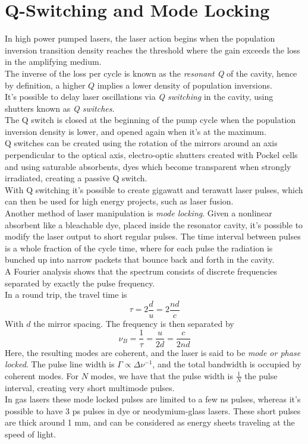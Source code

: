 \documentclass[../electromagnetism.tex]{subfiles}
\begin{document}
\section{Q-Switching and Mode Locking}
In high power pumped lasers, the laser action begins when the population inversion transition density reaches the threshold where the gain exceeds the loss in the amplifying medium.\\
The inverse of the loss per cycle is known as the \textit{resonant Q} of the cavity, hence by definition, a higher $Q$ implies a lower density of population inversions.\\
It's possible to delay laser oscillations via \textit{Q switching} in the cavity, using shutters known as \textit{Q switches}.\\
The Q switch is closed at the beginning of the pump cycle when the population inversion density is lower, and opened again when it's at the maximum.\\
Q switches can be created using the rotation of the mirrors around an axis perpendicular to the optical axis, electro-optic shutters created with Pockel cells and using saturable absorbents, dyes which become transparent when strongly irradiated, creating a passive Q switch.\\
With Q switching it's possible to create gigawatt and terawatt laser pulses, which can then be used for high energy projects, such as laser fusion.\\
Another method of laser manipulation is \textit{mode locking}. Given a nonlinear absorbent like a bleachable dye, placed inside the resonator cavity, it's possible to modify the laser output to short regular pulses. The time interval between pulses is a whole fraction of the cycle time, where for each pulse the radiation is bunched up into narrow packets that bounce back and forth in the cavity.\\
A Fourier analysis shows that the spectrum consists of discrete frequencies separated by exactly the pulse frequency.\\
In a round trip, the travel time is
\begin{equation*}
	\tau=2\frac{d}{u}=2\frac{nd}{c}
\end{equation*}
With $d$ the mirror spacing. The frequency is then separated by
\begin{equation*}
	\nu_B=\frac{1}{\tau}=\frac{u}{2d}=\frac{c}{2nd}
\end{equation*}
Here, the resulting modes are coherent, and the laser is said to be \textit{mode or phase locked}. The pulse line width is $\Gamma\propto\Delta\nu^{-1}$, and the total bandwidth is occupied by coherent modes. For $N$ modes, we have that the pulse width is $\frac{1}{N}$ the pulse interval, creating very short multimode pulses.\\
In gas lasers these mode locked pulses are limited to a few ns pulses, whereas it's possible to have 3 ps pulses in dye or neodymium-glass lasers. These short pulses are thick around 1 mm, and can be considered as energy sheets traveling at the speed of light.
\end{document}
